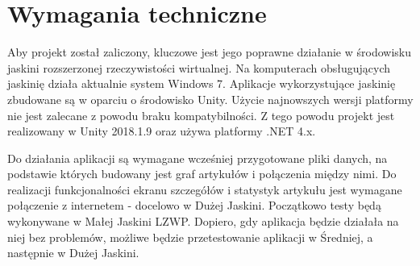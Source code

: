 \section{Wymagania techniczne}
Aby projekt został zaliczony, kluczowe jest jego poprawne działanie w środowisku jaskini rozszerzonej rzeczywistości wirtualnej. Na komputerach obsługujących jaskinię działa aktualnie system Windows 7. Aplikacje wykorzystujące jaskinię zbudowane są w oparciu o środowisko Unity. Użycie najnowszych wersji platformy nie jest zalecane z powodu braku kompatybilności. Z tego powodu projekt jest realizowany w Unity 2018.1.9 oraz używa platformy .NET 4.x.

Do działania aplikacji są wymagane wcześniej przygotowane pliki danych, na podstawie których budowany jest graf artykułów i połączenia między nimi. Do realizacji funkcjonalności ekranu szczegółów i statystyk artykułu jest wymagane połączenie z internetem - docelowo w Dużej Jaskini. Początkowo testy będą wykonywane w Małej Jaskini LZWP. Dopiero, gdy aplikacja będzie działała na niej bez problemów, możliwe będzie przetestowanie aplikacji w Średniej, a następnie w Dużej Jaskini.
